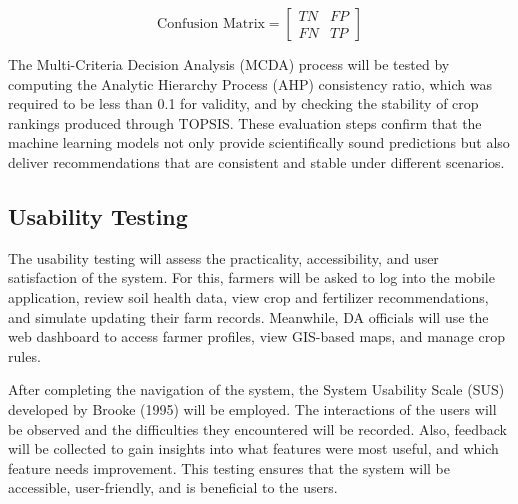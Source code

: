 {	\begin{equation}
		\text{Confusion Matrix} = 
		\begin{bmatrix}
			TN & FP \\
			FN & TP
		\end{bmatrix}
		\label{eq:confusionmatrix}
	\end{equation}
	
	The Multi-Criteria Decision Analysis (MCDA) process will be tested by computing the Analytic Hierarchy Process (AHP) consistency ratio, which was required to be less than 0.1 for validity, and by checking the stability of crop rankings produced through TOPSIS. These evaluation steps confirm that the machine learning models not only provide scientifically sound predictions but also deliver recommendations that are consistent and stable under different scenarios.
	
	\subsection{Usability Testing}
	The usability testing will assess the practicality, accessibility, and user satisfaction of the system. For this, farmers will be asked to log into the mobile application, review soil health data, view crop and fertilizer recommendations, and simulate updating their farm records. Meanwhile, DA officials will use the web dashboard to access farmer profiles, view GIS-based maps, and manage crop rules.
	
	After completing the navigation of the system, the System Usability Scale (SUS) developed by Brooke (1995) will be employed. The interactions of the users will be observed and the difficulties they encountered will be recorded. Also, feedback will be collected to gain insights into what features were most useful, and which feature needs improvement. This testing ensures that the system will be accessible, user-friendly, and is beneficial to the users.
	
}
